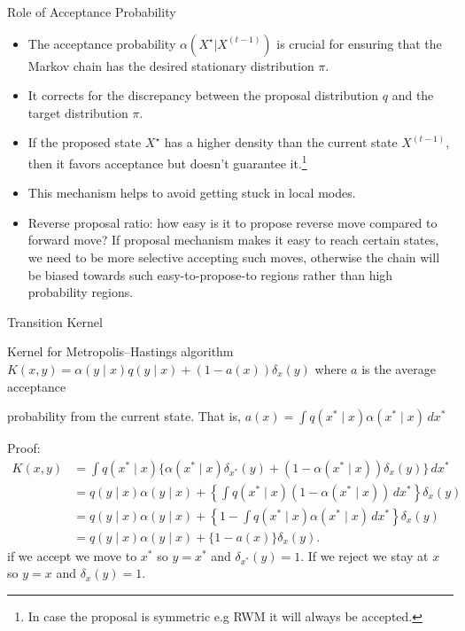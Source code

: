 \begin{frame}{Role of Acceptance Probability}
	\begin{itemize}
		\item The acceptance probability $\alpha(X^{\star} | X^{(t-1)})$ is crucial for ensuring 
		that the Markov chain has the desired stationary distribution $\pi$.
		\item It corrects for the discrepancy between the proposal distribution $q$ and
		the target distribution $\pi$.
		\item If the proposed state $X^{\star}$ has a higher density than the current state $X^{(t-1)}$, 
		then it favors acceptance but doesn't guarantee it.\footnote{In case the proposal is symmetric e.g RWM it will always be accepted.}
		\item This mechanism helps to avoid getting stuck in local modes.
		\item Reverse proposal ratio: how easy is it to propose reverse move compared to forward move? If proposal mechanism makes it easy to reach certain states, we need to be more selective accepting such moves, otherwise the chain will be biased towards such easy-to-propose-to regions rather than high probability regions.
	\end{itemize}
\end{frame}

\begin{frame}{Transition Kernel}
	\begin{block}{Kernel for Metropolis--Hastings algorithm }
		$K(x, y) = \alpha(y \mid x)q(y \mid x) + (1 - a(x))\delta_x(y)$ where $a$ is the average acceptance 
		
		\vspace{0.2cm}
		probability from the current state. That is, $a(x) = \int q(x^* \mid x)\alpha(x^* \mid x)\,dx^*$
	\end{block}
	Proof:
	\begin{align*}
		K(x,y)
		 & = \int q(x^* \mid x)\Big\{\alpha(x^* \mid x)\delta_{x^*}(y) + (1 - \alpha(x^* \mid x))\delta_x(y)\Big\}\,dx^*  \\
		 & = q(y \mid x)\alpha(y \mid x) + \left\{\int q(x^* \mid x)(1 - \alpha(x^* \mid x))\,dx^*\right\}\delta_x(y)     \\
		 & = q(y \mid x)\alpha(y \mid x) + \left\{1 - \int q(x^* \mid x)\alpha(x^* \mid x)\,dx^*\right\}\delta_x(y)       \\
		 & = q(y \mid x)\alpha(y \mid x) + \{1 - a(x)\}\delta_x(y).
	\end{align*}
	{\tiny if we accept we move to $x^*$ so $y=x^*$ and $\delta_{x^*}(y)=1$. If we reject we stay at $x$ so $y=x$ and $\delta_x(y)=1$.}
\end{frame}

